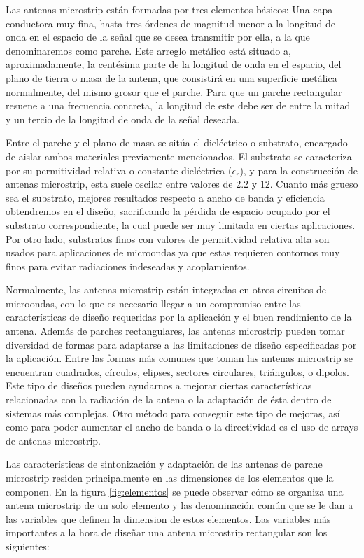 \par Las antenas microstrip están formadas por tres elementos básicos: Una capa conductora muy fina, hasta tres órdenes de magnitud menor a la longitud de onda en el espacio de la señal que se desea transmitir por ella, a la que denominaremos como parche. Este arreglo metálico está situado a, aproximadamente, la centésima parte de la longitud de onda en el espacio, del plano de tierra o masa de la antena, que consistirá en una superficie metálica normalmente, del mismo grosor que el parche. Para que un parche rectangular resuene a una frecuencia concreta, la longitud de este debe ser de entre la mitad y un tercio de la longitud de onda de la señal deseada.
\\
\par Entre el parche y el plano de masa se sitúa el dieléctrico o substrato, encargado de aislar ambos materiales previamente mencionados. El substrato se caracteriza por su permitividad relativa o constante dieléctrica ($\epsilon_{r}$), y para la construcción de antenas microstrip, esta suele oscilar entre valores de 2.2 y 12. Cuanto más grueso sea el substrato, mejores resultados respecto a ancho de banda y eficiencia obtendremos en el diseño, sacrificando la pérdida de espacio ocupado por el substrato correspondiente, la cual puede ser muy limitada en ciertas aplicaciones. Por otro lado, substratos finos con valores de permitividad relativa alta son usados para aplicaciones de microondas ya que estas requieren contornos muy finos para evitar radiaciones indeseadas y acoplamientos.
\\
\par Normalmente, las antenas microstrip están integradas en otros circuitos de microondas, con lo que es necesario llegar a un compromiso entre las características de diseño requeridas por la aplicación y el buen rendimiento de la antena. Además de parches rectangulares, las antenas microstrip pueden tomar diversidad de formas para adaptarse a las limitaciones de diseño especificadas por la aplicación. Entre las formas más comunes que toman las antenas microstrip se encuentran cuadrados, círculos, elipses, sectores circulares, triángulos, o dipolos. Este tipo de diseños pueden ayudarnos a mejorar ciertas características relacionadas con la radiación de la antena o la adaptación de ésta dentro de sistemas más complejas. Otro método para conseguir este tipo de mejoras, así como para poder aumentar el ancho de banda o la directividad es el uso de arrays de antenas microstrip. 
\\
\par Las características de sintonización y adaptación de las antenas de parche microstrip residen principalmente en las dimensiones de los elementos que la componen. En la figura \ref{fig:elementos} se puede observar cómo se organiza una antena microstrip de un solo elemento y las denominación común que se le dan a las variables que definen la dimension de estos elementos. Las variables más importantes a la hora de diseñar una antena microstrip rectangular son los siguientes:

